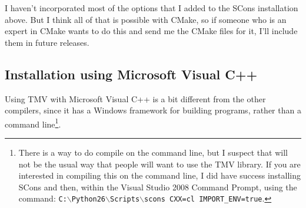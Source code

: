 \documentclass[twoside,letterpaper,11pt]{article}
\begin{document}
I haven't incorporated most of the options that I added to the SCons installation above.
But I think all of that is possible with CMake, so if someone who is an expert in CMake wants
to do this and send me the CMake files for it, I'll include them in future releases.

\subsection{Installation using Microsoft Visual C++}
\label{Install_Microsoft}

Using TMV with Microsoft Visual C++ is a bit different from the other compilers,
since it has a Windows framework for building programs, rather than a command 
line\footnote{
There is a way to do compile on the command line, but I suspect that will not be the 
usual way that people will want to use the TMV library.  If you are interested in compiling
this on the command line, I did have success installing SCons and then, within the
Visual Studio 2008 Command Prompt, using the command:
\texttt{C:$\backslash$Python26$\backslash$Scripts$\backslash$scons CXX=cl IMPORT\_ENV=true}.}.
\end{document}
